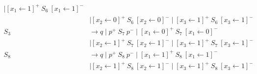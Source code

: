 \begin{align*}
      \mid [x_1 \leftarrow 1]^+ \ S_6 \ [x_1 \leftarrow 1]^- \\ 
    & \mid [x_2 \leftarrow 0]^+ \ S_6 \ [x_2 \leftarrow 0]^- 
      \mid [x_3 \leftarrow 1]^+ \ S_6 \ [x_3 \leftarrow 1]^- \\
S_3 & \to q \mid p^+ \ S_7 \ p^- 
      \mid [x_1 \leftarrow 0]^+ \ S_7 \ [x_1 \leftarrow 0]^- \\ 
    & \mid [x_2 \leftarrow 1]^+ \ S_7 \ [x_2 \leftarrow 1]^- 
      \mid [x_3 \leftarrow 1]^+ \ S_7 \ [x_3 \leftarrow 1]^- \\
S_8 & \to q \mid p^+ \ S_8 \ p^- 
      \mid [x_1 \leftarrow 1]^+ \ S_8 \ [x_1 \leftarrow 1]^- \\ 
    & \mid [x_2 \leftarrow 1]^+ \ S_8 \ [x_2 \leftarrow 1]^- 
      \mid [x_3 \leftarrow 1]^+ \ S_8 \ [x_3 \leftarrow 1]^- \\
\end{align*}

